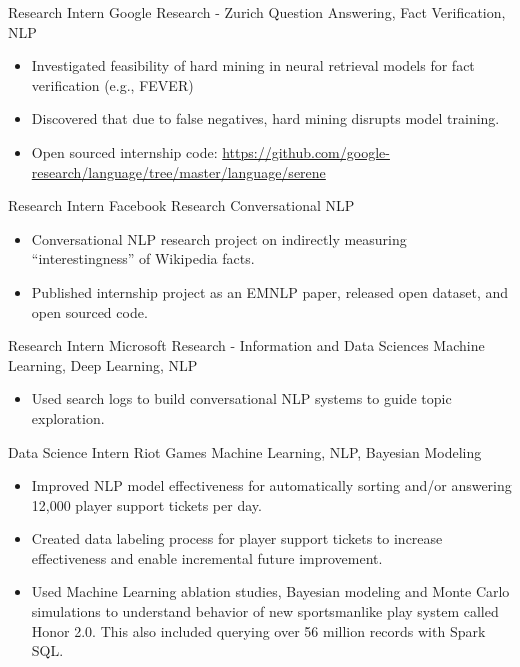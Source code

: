 \documentclass[11pt,a4paper,sans]{moderncv} %
\begin{document}
		{Research Intern}
		{Google Research - Zurich}
		{Question Answering, Fact Verification, NLP}
		{}
		{
			\begin{itemize}
				\item Investigated feasibility of hard mining in neural retrieval models for fact verification (e.g., FEVER)
				\item Discovered that due to false negatives, hard mining disrupts model training.
				\item Open sourced internship code: \href{https://github.com/google-research/language/tree/master/language/serene}{https://github.com/google-research/language/tree/master/language/serene}
			\end{itemize}
		}

		{Research Intern}
		{Facebook Research}
		{Conversational NLP}
		{}
		{
			\begin{itemize}
				\item Conversational NLP research project on indirectly measuring ``interestingness'' of Wikipedia facts.
				\item Published internship project as an EMNLP paper, released open dataset, and open sourced code.
			\end{itemize}
		}

		{Research Intern}
		{Microsoft Research - Information and Data Sciences}
		{Machine Learning, Deep Learning, NLP}
		{}
		{
			\begin{itemize}
			\item Used search logs to build conversational NLP systems to guide topic exploration.
			\end{itemize}
		}
		{Data Science Intern}
		{Riot Games}
		{Machine Learning, NLP, Bayesian Modeling}
		{}
		{
			\begin{itemize}
			\item Improved NLP model effectiveness for automatically sorting and/or answering 12,000 player support tickets per day.
			\item Created data labeling process for player support tickets to increase effectiveness and enable incremental future improvement.
			\item Used Machine Learning ablation studies, Bayesian modeling and Monte Carlo simulations to understand behavior of new sportsmanlike play system called Honor 2.0. This also included querying over 56 million records with Spark SQL.
			\end{itemize}
		}
\end{document}
